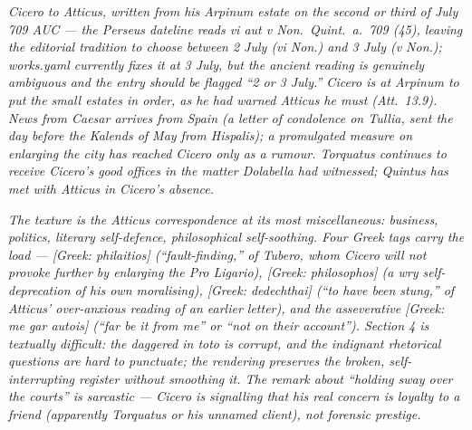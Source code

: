 
\textit{Cicero to Atticus, written from his Arpinum
estate on the second or third of July 709 AUC ---
the Perseus dateline reads \textit{vi aut v Non.\
Quint.\ a.\ 709 (45)}, leaving the editorial tradition
to choose between 2 July (vi Non.) and 3 July (v Non.);
works.yaml currently fixes it at 3 July, but the
ancient reading is genuinely ambiguous and the entry
should be flagged ``2 or 3 July.'' Cicero is at Arpinum
to put the small estates in order, as he had warned
Atticus he must (Att.\ 13.9). News from Caesar arrives
from Spain (a letter of condolence on Tullia, sent the
day before the Kalends of May from Hispalis); a
promulgated measure on enlarging the city has reached
Cicero only as a rumour. Torquatus continues to receive
Cicero's good offices in the matter Dolabella had
witnessed; Quintus has met with Atticus in Cicero's
absence.}

\textit{The texture is the Atticus correspondence at
its most miscellaneous: business, politics, literary
self-defence, philosophical self-soothing. Four Greek
tags carry the load --- \textit{[Greek: philaitios]}
(``fault-finding,'' of Tubero, whom Cicero will not
provoke further by enlarging the \textit{Pro Ligario}),
\textit{[Greek: philosophos]} (a wry self-deprecation
of his own moralising), \textit{[Greek: dedechthai]}
(``to have been stung,'' of Atticus' over-anxious
reading of an earlier letter), and the asseverative
\textit{[Greek: me gar autois]} (``far be it from me''
or ``not on their account''). Section 4 is textually
difficult: the daggered \textit{in toto} is corrupt,
and the indignant rhetorical questions are hard to
punctuate; the rendering preserves the broken,
self-interrupting register without smoothing it. The
remark about ``holding sway over the courts'' is
sarcastic --- Cicero is signalling that his real
concern is loyalty to a friend (apparently Torquatus
or his unnamed client), not forensic prestige.}

